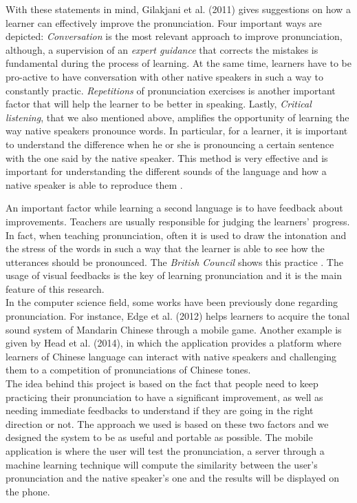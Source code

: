 \noindent With these statements in mind, Gilakjani et al. (2011) gives suggestions on how a learner can effectively improve the pronunciation. Four important ways are depicted: \textit{Conversation} is the most relevant approach to improve pronunciation, although, a supervision of an \textit{expert guidance} that corrects the mistakes is fundamental during the process of learning. At the same time, learners have to be pro-active to have conversation with other native speakers in such a way to constantly practic. \textit{Repetitions} of pronunciation exercises is another important factor that will help the learner to be better in speaking. Lastly, \textit{Critical listening}, that we also mentioned above, amplifies the opportunity of learning the way native speakers pronounce words. In particular, for a learner, it is important to understand the difference when he or she is pronouncing a certain sentence with the one said by the native speaker. This method is very effective and is important for understanding the different sounds of the language and how a native speaker is able to reproduce them \cite{rost2014listening}.

\noindent An important factor while learning a second language is to have feedback about improvements. Teachers are usually responsible for judging the learners' progress. In fact, when teaching pronunciation, often it is used to draw the intonation and the stress of the words in such a way that the learner is able to see how the utterances should be pronounced. The \textit{British Council} shows this practice \cite{bbc_stress}. The usage of visual feedbacks is the key of learning pronunciation and it is the main feature of this research. \\

\noindent In the computer science field, some works have been previously done regarding pronunciation. For instance, Edge et al. (2012) helps learners to acquire the tonal sound system of Mandarin Chinese through a mobile game. Another example is given by Head et al. (2014), in which the application provides a platform where learners of Chinese language can interact with native speakers and challenging them to a competition of pronunciations of Chinese tones. \\

\noindent The idea behind this project is based on the fact that people need to keep practicing their pronunciation to have a significant improvement, as well as needing immediate feedbacks to understand if they are going in the right direction or not. The approach we used is based on these two factors and we designed the system to be as useful and portable as possible. The mobile application is where the user will test the pronunciation, a server through a machine learning technique will compute the similarity between the user's pronunciation and the native speaker's one and the results will be displayed on the phone. \\

